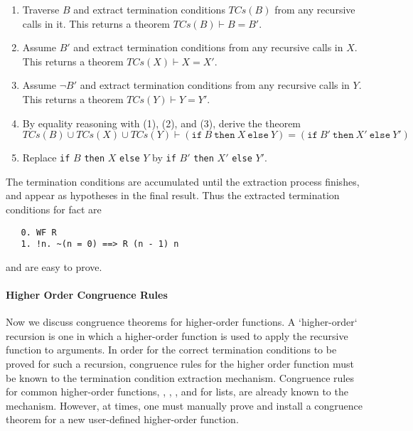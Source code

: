 \begin{enumerate}

\item Traverse $B$ and extract termination conditions
     $\mathit{TCs}(B)$ from any recursive calls in it.
     This returns a theorem $\mathit{TCs}(B) \vdash B = B'$.

\item Assume $B'$ and extract termination conditions from any
  recursive calls in $X$. This returns a theorem
  $\mathit{TCs}(X) \vdash X = X'$.

\item Assume $\neg B'$ and extract termination conditions from any
   recursive calls in $Y$. This returns a theorem
   $\mathit{TCs}(Y) \vdash Y = Y'$.

\item  By equality reasoning with (1), (2), and (3), derive the theorem
\[\mathit{TCs}(B) \cup \mathit{TCs}(X) \cup \mathit{TCs}(Y)
  \vdash
  (\mathtt{if}\ B\ \mathtt{then}\ X\ \mathtt{else}\ Y) =
  (\mathtt{if}\ B'\ \mathtt{then}\ X'\ \mathtt{else}\ Y')
\]
\item Replace \texttt{if} $B$ \texttt{then} $X$ \texttt{else} $Y$ by
\texttt{if} $B'$ \texttt{then} $X'$ \texttt{else} $Y'$.

\end{enumerate}


The termination conditions are accumulated until the
extraction process finishes, and appear as hypotheses in the final
result. Thus the extracted termination conditions for {fact} are
%
\begin{hol}
\begin{verbatim}
   0. WF R
   1. !n. ~(n = 0) ==> R (n - 1) n
\end{verbatim}
\end{hol}
%
and are easy to prove.

\paragraph{Higher Order Congruence Rules}

Now we discuss congruence theorems for higher-order functions. A
`higher-order` recursion is one in which a higher-order function is
used to apply the recursive function to arguments. In order for the
correct termination conditions to be proved for such a recursion,
congruence rules for the higher order function must be known to the
termination condition extraction mechanism. Congruence rules for
common higher-order functions, \eg, , , and
 for lists, are already known to the
mechanism. However, at times, one must manually prove and install a
congruence theorem for a new user-defined higher-order function.

